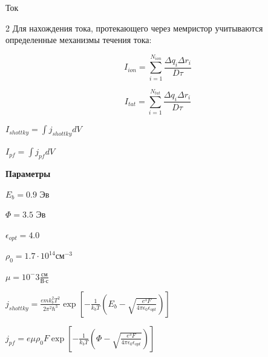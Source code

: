 \documentclass{beamer}%
\begin{document}
\begin {frame} {Ток}

\begin {footnotesize}

\begin {multicols} {2}
Для нахождения тока, протекающего через мемристор учитываются определенные механизмы течения тока:

\[I_{ion} = \sum_{i=1}^{N_{ion}} \frac{\Delta q_{i} \Delta r_i} {D \tau } \]

\[I_{tat} = \sum_{i=1}^{N_{tat}} \frac{\Delta q_{i} \Delta r_i} {D \tau } \]

\columnbreak

$I_{shottky} =  \int  {j_{shottky}dV}$

$I_{pf} = \int {j_{pf}dV}$

\hspace{30px}

\textbf{Параметры}

$E_b = 0.9$ Эв \footnotemark[8]

$\Phi = 3.5$ Эв

$\epsilon_{opt} = 4.0$ \footnotemark[6]

$\rho_0 = 1.7 \cdot 10^{14} \text{см}^{-3} $ \footnotemark[6]

$\mu = 10^-3 \frac{\text{см}}{\text{В}\cdot\text{с}} $


\end{multicols}
$
    j_{shottky} = \frac{e m k_b^2 T^2} {2 \pi^2 \hbar^3}
    \exp\left[-\frac{1}{k_b T}\left(E_b-\sqrt{\frac{e^3 F}{4\pi\epsilon_0\epsilon_{opt}}}\right)\right]
$ 
\footnotemark[6]

$
    j_{pf} = e\mu\rho_0 F \exp 
    \left[-\frac{1}{k_bT}\left(\Phi-\sqrt{\frac{e^3 F}{4\pi\epsilon_0\epsilon_{opt}}}\right)\right]
$
\footnotemark[7]


\end {footnotesize}


\end{frame}


\end{document}
